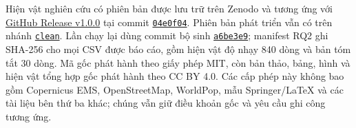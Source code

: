\documentclass[runningheads]{llncs}
\begin{document}
Hiện vật nghiên cứu có phiên bản được lưu trữ trên Zenodo
\cite{nguyen2026floodartifact} và tương ứng với
\href{https://github.com/ngthtrong/nckh2/releases/tag/v1.0.0}{GitHub Release
v1.0.0} tại commit
\href{https://github.com/ngthtrong/nckh2/commit/04e0f04a7376cbbb02a1a95ecb4e3147d56c575b}{\texttt{04e0f04}}.
Phiên bản phát triển vẫn có trên nhánh
\href{https://github.com/ngthtrong/nckh2/tree/clean}{\texttt{clean}}.
Lần chạy lại dùng commit bộ sinh
\href{https://github.com/ngthtrong/nckh2/commit/a6be3e988dad1aa442c8c8e158c2bba96b2b7fb9}{\texttt{a6be3e9}};
manifest RQ2 ghi SHA-256 cho mọi CSV được báo cáo, gồm hiện vật độ nhạy 840
dòng và bản tóm tắt 30 dòng. Mã gốc phát hành theo giấy phép MIT, còn bản
thảo, bảng, hình và hiện vật tổng hợp gốc phát hành theo CC BY 4.0. Các cấp
phép này không bao gồm Copernicus EMS, OpenStreetMap, WorldPop, mẫu
Springer/LaTeX và các tài liệu bên thứ ba khác; chúng vẫn giữ điều khoản gốc
và yêu cầu ghi công tương ứng.



\end{document}
